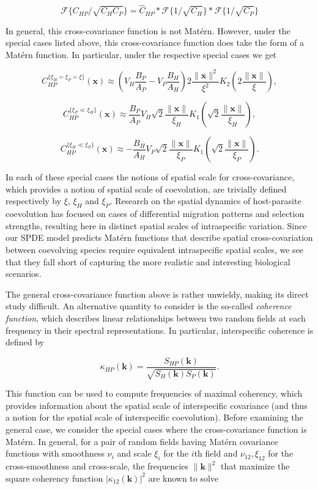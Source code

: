 \documentclass{article}
\begin{document}
\[\mathcal F\{C_{HP}/\sqrt{C_HC_P}\}=\hat C_{HP}*\mathcal F\{1/\sqrt{C_H}\}*\mathcal F\{1/\sqrt{C_P}\}\]

In general, this cross-covariance function is not Matérn. However, under
the special cases listed above, this cross-covariance function does take
the form of a Matérn function. In particular, under the respective
special cases we get

\[C_{HP}^{\{\xi_H=\xi_P=\xi\}}(\pmb x)\approx\left(V_H\frac{B_P}{A_P}-V_P\frac{B_H}{A_H}\right)2\frac{\|\pmb x\|^2}{\xi^2}K_2\left(2\frac{\|\pmb x\|}{\xi}\right),\]

\[C_{HP}^{\{\xi_P\ll\xi_H\}}(\pmb x)\approx\frac{B_P}{A_P}V_H\sqrt2\frac{\|\pmb x\|}{\xi_H}K_1\left(\sqrt2\frac{\|\pmb x\|}{\xi_H}\right),\]

\[C_{HP}^{\{\xi_H\ll\xi_P\}}(\pmb x)\approx-\frac{B_H}{A_H}V_P\sqrt2\frac{\|\pmb x\|}{\xi_P}K_1\left(\sqrt2\frac{\|\pmb x\|}{\xi_P}\right).\]

In each of these special cases the notions of spatial scale for
cross-covariance, which provides a notion of spatial scale of
coevolution, are trivially defined respectively by \(\xi\), \(\xi_H\)
and \(\xi_P\). Research on the spatial dynamics of host-parasite
coevolution has focused on cases of differential migration patterns and
selection strengths, resulting here in distinct spatial scales of
intraspecific variation. Since our SPDE model predicts Matérn functions
that describe spatial cross-covariation between coevolving species
require equivalent intraspecific spatial scales, we see that they fall
short of capturing the more realistic and interesting biological
scenarios.

The general cross-covariance function above is rather unwieldy, making
its direct study difficult. An alternative quantity to consider is the
so-called \emph{coherence function}, which describes linear
relationships between two random fields at each frequency in their
spectral representations. In particular, interspecific coherence is
defined by

\[\kappa_{HP}(\pmb k)=\frac{S_{HP}(\pmb k)}{\sqrt{S_H(\pmb k)S_P(\pmb k)}}.\]

This function can be used to compute frequencies of maximal coherency,
which provides information about the spatial scale of interspecific
covariance (and thus a notion for the spatial scale of interspecific
coevolution). Before examining the general case, we consider the special
cases where the cross-covariance function is Matérn. In general, for a
pair of random fields having Matérn covariance functions with smoothness
\(\nu_i\) and scale \(\xi_i\) for the \(i\)th field and
\(\nu_{12},\xi_{12}\) for the cross-smoothness and cross-scale, the
frequencies \(\|\pmb k\|^2\) that maximize the square coherency function
\(|\kappa_{12}(\pmb k)|^2\) are known to solve
\end{document}
